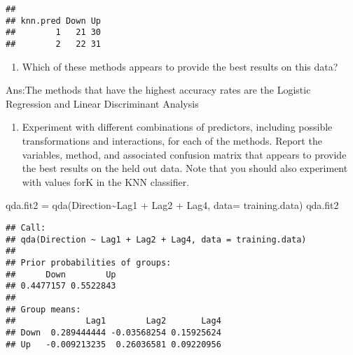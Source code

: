 \documentclass[
]{article}
\newenvironment{Shaded}{\begin{snugshade}}{\end{snugshade}}
\newcommand{\AttributeTok}[1]{\textcolor[rgb]{0.77,0.63,0.00}{#1}}
\newcommand{\FunctionTok}[1]{\textcolor[rgb]{0.00,0.00,0.00}{#1}}
\newcommand{\NormalTok}[1]{#1}
\newcommand{\OtherTok}[1]{\textcolor[rgb]{0.56,0.35,0.01}{#1}}
\newcommand{\SpecialCharTok}[1]{\textcolor[rgb]{0.00,0.00,0.00}{#1}}
\newcommand{\StringTok}[1]{\textcolor[rgb]{0.31,0.60,0.02}{#1}}
\providecommand{\tightlist}{%
  \setlength{\itemsep}{0pt}\setlength{\parskip}{0pt}}
\begin{document}
\begin{verbatim}
##         
## knn.pred Down Up
##        1   21 30
##        2   22 31
\end{verbatim}

\begin{enumerate}
\def\labelenumi{(\alph{enumi})}
\setcounter{enumi}{7}
\tightlist
\item
  Which of these methods appears to provide the best results on this
  data?
\end{enumerate}

Ans:The methods that have the highest accuracy rates are the Logistic
Regression and Linear Discriminant Analysis

\begin{enumerate}
\def\labelenumi{(\roman{enumi})}
\tightlist
\item
  Experiment with different combinations of predictors, including
  possible transformations and interactions, for each of the methods.
  Report the variables, method, and associated confusion matrix that
  appears to provide the best results on the held out data. Note that
  you should also experiment with values forK in the KNN classifier.
\end{enumerate}

\begin{Shaded}
\begin{Highlighting}[]
\NormalTok{qda.fit2 }\OtherTok{=} \FunctionTok{qda}\NormalTok{(Direction}\SpecialCharTok{\textasciitilde{}}\NormalTok{Lag1 }\SpecialCharTok{+}\NormalTok{ Lag2 }\SpecialCharTok{+}\NormalTok{ Lag4, }\AttributeTok{data=}\NormalTok{ training.data)}
\NormalTok{qda.fit2}
\end{Highlighting}
\end{Shaded}

\begin{verbatim}
## Call:
## qda(Direction ~ Lag1 + Lag2 + Lag4, data = training.data)
## 
## Prior probabilities of groups:
##      Down        Up 
## 0.4477157 0.5522843 
## 
## Group means:
##              Lag1        Lag2       Lag4
## Down  0.289444444 -0.03568254 0.15925624
## Up   -0.009213235  0.26036581 0.09220956
\end{verbatim}

\begin{Shaded}
\end{Shaded}
\end{document}

